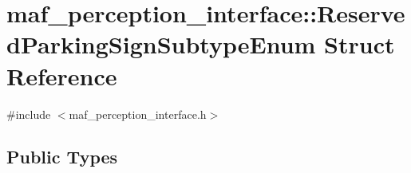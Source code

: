\hypertarget{structmaf__perception__interface_1_1ReservedParkingSignSubtypeEnum}{}\section{maf\+\_\+perception\+\_\+interface\+:\+:Reserved\+Parking\+Sign\+Subtype\+Enum Struct Reference}
\label{structmaf__perception__interface_1_1ReservedParkingSignSubtypeEnum}


{\ttfamily \#include $<$maf\+\_\+perception\+\_\+interface.\+h$>$}

\subsection*{Public Types}

